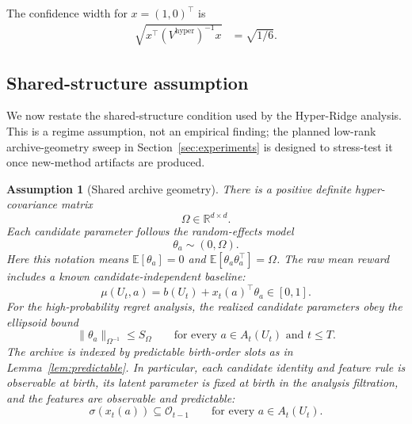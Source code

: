 \documentclass{article} %
\newtheorem{assumption}{Assumption}
\begin{document}
The confidence width for \(x=(1,0)^\top\) is
\begin{align}
\label{eq:hyper-example-width}
\sqrt{x^\top (V^{\mathrm{hyper}})^{-1}x}
&=
\sqrt{1/6}.
\end{align}

\subsection{Shared-structure assumption}

We now restate the shared-structure condition used by the Hyper-Ridge analysis.  This is a regime assumption, not an empirical finding; the planned low-rank archive-geometry sweep in Section~\ref{sec:experiments} is designed to stress-test it once new-method artifacts are produced.

\begin{assumption}[Shared archive geometry]
\label{assump:shared-structure-app}
There is a positive definite hyper-covariance matrix
\begin{equation}
\label{eq:hyper-assump-omega}
\Omega\in\mathbb{R}^{d\times d}.
\end{equation}
Each candidate parameter follows the random-effects model
\begin{equation}
\label{eq:hyper-assump-random}
\theta_a\sim(0,\Omega).
\end{equation}
Here this notation means $\mathbb E[\theta_a]=0$ and
$\mathbb E[\theta_a\theta_a^\top]=\Omega$. The raw mean reward includes a
known candidate-independent baseline:
\begin{equation}
\label{eq:hyper-assump-bounded-mean}
\mu(U_t,a)
=
b(U_t)+x_t(a)^\top\theta_a
\in[0,1].
\end{equation}
For the high-probability regret analysis, the realized candidate parameters obey the ellipsoid bound
\begin{equation}
\label{eq:hyper-assump-ellipsoid}
\|\theta_a\|_{\Omega^{-1}}
\le
S_{\Omega}
\qquad
\text{for every } a\in A_t(U_t)\text{ and }t\le T .
\end{equation}
The archive is indexed by predictable birth-order slots as in
Lemma~\ref{lem:predictable}. In particular, each candidate identity and feature
rule is observable at birth, its latent parameter is fixed at birth in the
analysis filtration, and the features are observable and predictable:
\begin{equation}
\label{eq:hyper-assump-predictable}
\sigma(x_t(a))\subseteq\mathcal{O}_{t-1}
\qquad
\text{for every }a\in A_t(U_t).
\end{equation}

\end{assumption}
\end{document}
